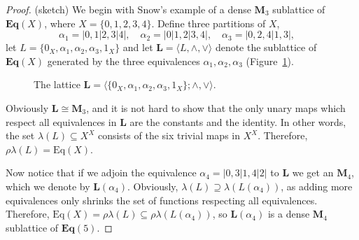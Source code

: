 \documentclass[cm,dissertation,actual,final]{uhthesis}
\theoremstyle{plain}
\theoremstyle{definition}
\theoremstyle{remark}
\numberwithin{theorem}{section}
\numberwithin{claim}{chapter}
\numberwithin{equation}{section}
\numberwithin{conjecture}{chapter}
\newcommand{\<}{\ensuremath{\langle}}
\renewcommand{\>}{\ensuremath{\rangle}}
\newcommand{\meet}{\ensuremath{\wedge}}
\newcommand{\join}{\ensuremath{\vee}}
\newcommand{\Eq}{\ensuremath{\mathrm{Eq}}}
\newcommand{\bEq}{\ensuremath{\mathbf{Eq}}}
\newcommand{\0}{\ensuremath{\mathbf{0}}}
\newcommand{\1}{\ensuremath{\mathbf{1}}}
\newcommand{\2}{\ensuremath{\mathbf{2}}}
\newcommand{\3}{\ensuremath{\mathbf{3}}}
\newcommand{\4}{\ensuremath{\mathbf{4}}}
\newcommand{\5}{\ensuremath{\mathbf{5}}}
\newcommand{\bL}{\ensuremath{\mathbf{L}}}
\newcommand{\bM}{\ensuremath{\mathbf{M}}}
\begin{document}
\begin{proof} (sketch)
We begin with Snow's example of a dense $\bM_3$ sublattice of $\bEq(X)$, where 
$X =  \{0,1,2,3,4\}$.  
Define three partitions of $X$,
\[
\alpha_1 = |0,1|2,3|4|, \quad 
\alpha_2 = |0|1,2|3,4|, \quad 
\alpha_3 = |0,2,4|1,3|, \quad 
\]
let $L =\{0_X, \alpha_1, \alpha_2, \alpha_3, 1_X\}$ and let $\bL  = \<L, \meet, \join\>$ denote the 
sublattice of $\bEq(X)$ generated by the three equivalences $\alpha_1, \alpha_2,
\alpha_3$ (Figure~\ref{fig:diamondeq}).

\begin{figure}[centering,h]
\caption{The lattice $\bL  = \<\{ 0_X, \alpha_1, \alpha_2, \alpha_3, 1_X \};
  \meet, \join\>$.}
\label{fig:diamondeq}
\begin{center}
\end{center}
\end{figure}
\noindent Obviously $\bL \cong \bM_3$, and it is not hard to show that the only
unary maps which respect all equivalences in $\bL$ are the constants and the
identity.  In other words, the set $\lambda(L)\subseteq X^X$ consists of
the six trivial maps in $X^X$.   Therefore, $\rho \lambda(L) = \Eq(X)$.

Now notice that if we adjoin the equivalence $\alpha_4 = |0,3|1,4|2|$ to $\bL$ we get
an $\bM_4$, which we denote by $\bL(\alpha_4)$.  Obviously,
$\lambda(L) \supseteq \lambda(L(\alpha_4))$, as adding more equivalences
only shrinks the set of functions respecting all equivalences.
Therefore, $\Eq(X) = \rho \lambda(L) \subseteq \rho \lambda(L(\alpha_4))$, so
$\bL(\alpha_4)$ is a dense $\bM_4$ sublattice of $\bEq(5)$.


\end{proof}
\end{document}
